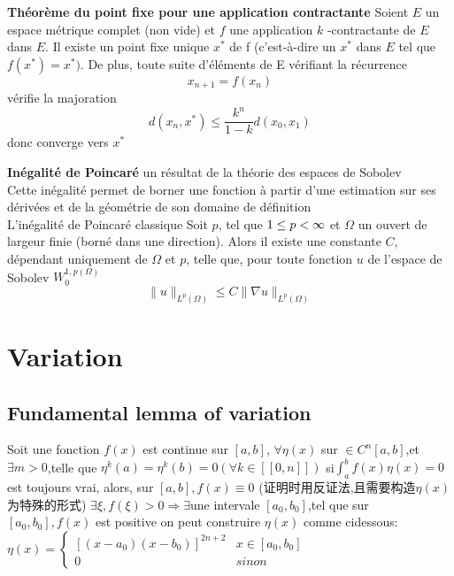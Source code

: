 \documentclass{book}
\begin{document}
\textbf{Th\'eor\`eme du point fixe pour une application contractante}\newline
Soient $ E$  un espace m\'etrique complet (non vide) et $ f$  une application $ k$ -contractante de $E$ dans $E$.
Il existe un point fixe unique $x^*$ de f (c'est-\`a-dire un $x^*$ dans $E$ tel que $f(x^*) = x^*)$.
De plus, toute suite d'\'el\'ements de E v\'erifiant la r\'ecurrence
$$x_{n+1}=f(x_n)$$
v\'erifie la majoration
$$d(x_n,x^*) \le \frac {k^n}{1-k} d(x_0,x_1)$$
donc converge vers $x^*$
\bigskip

\textbf{In\'egalit\'e de Poincar\'e}
un r\'esultat de la th\'eorie des espaces de Sobolev\\
Cette in\'egalit\'e permet de borner une fonction \`a partir d'une estimation sur ses d\'eriv\'ees et de la g\'eom\'etrie de son domaine de d\'efinition\\
L'in\'egalit\'e de Poincar\'e classique
Soit $p$, tel que $1 \leq p < \infty$ et $\Omega$ un ouvert de largeur finie (born\'e dans une direction).
Alors il existe une constante $C$, d\'ependant uniquement de $\Omega$ et $p$, telle que, pour toute fonction $u$ de l'espace de Sobolev $W_0^{1,p(\Omega)}$
$$ \| u \|_{L^{p} (\Omega)} \leq C \| \nabla u \|_{L^{p} (\Omega)} $$

\chapter{Variation}
\section{Fundamental lemma of variation}
\begin{theorem}
Soit une fonction $f(x)$ est continue sur $[a,b]$,
$\forall \eta(x)$ sur $\in C^{n}[a,b]$,et $\exists m>0$,telle que $\eta^{k}(a)=\eta^{k}(b)=0 (\forall k \in [[0,n]])$ \newline
si$ \int_{a}^{b}f(x)\eta(x)=0$ est toujours vrai, \newline
alors, sur $[a,b],f(x)\equiv 0$ \newline
(证明时用反证法,且需要构造$\eta(x)$为特殊的形式)
$\exists \xi,f(\xi)>0 \Rightarrow \exists $une intervale $[a_0,b_0]$,tel que sur $[a_0,b_0],f(x)$ est positive \newline
on peut construire $\eta(x)$ comme cidessous:
$\eta(x)=
    \left\{
      \begin{array}{ll}
        [(x-a_0)(x-b_0)]^{2n+2} & x \in [a_0,b_0] \\
        0 & sinon
      \end{array}
    \right.
    $
\end{theorem}
\end{document}
